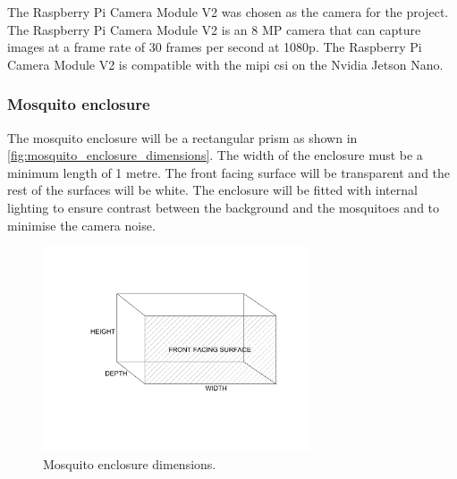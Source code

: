 The Raspberry Pi Camera Module V2 was chosen as the camera for the project. The Raspberry Pi Camera Module V2 is an 8 MP camera that can capture images at a frame rate of 30 frames per second at 1080p. The Raspberry Pi Camera Module V2 is compatible with the \gls{mipi} \gls{csi} on the Nvidia Jetson Nano.



\subsubsection{Mosquito enclosure}
The mosquito enclosure will be a rectangular prism as shown in \autoref{fig:mosquito_enclosure_dimensions}. The width of the enclosure must be a minimum length of 1 metre. The front facing surface will be transparent and the rest of the surfaces will be white. The enclosure will be fitted with internal lighting to ensure contrast between the background and the mosquitoes and to minimise the camera noise.
\begin{figure}[h]
    \centering
    \includegraphics[width=0.7\textwidth]{figures/hardware_design/mos_enclosure.pdf}
    \caption{Mosquito enclosure dimensions.}
    \label{fig:mosquito_enclosure_dimensions}
\end{figure}



